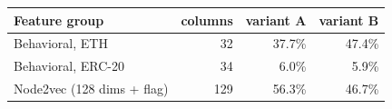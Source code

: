 \begin{tabular}{l r r r}
\toprule
Feature group & columns & variant A & variant B\\
\midrule
Behavioral, ETH & 32 & 37.7\% & 47.4\%\\
Behavioral, ERC-20 & 34 & 6.0\% & 5.9\%\\
Node2vec (128 dims + flag) & 129 & 56.3\% & 46.7\%\\
\bottomrule
\end{tabular}